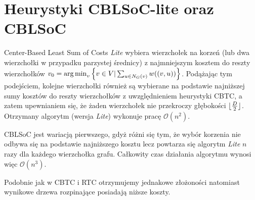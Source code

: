 \section{Heurystyki CBLSoC-lite oraz CBLSoC}

Center-Based Least Sum of Costs \textit{Lite} wybiera wierzchołek na korzeń (lub dwa wierzchołki w przypadku parzystej średnicy) z najmniejszym kosztem do reszty wierzchołków $v_0 = \operatorname*{arg\,min}_v\left\{v\in V | \sum_{u \in N_G(v)} w((v, u))\right\}$. Podążając tym podejściem, kolejne wierzchołki również są wybierane na podstawie najniższej sumy kosztów do reszty wierzchołków z uwzględnieniem heurystyki CBTC, a zatem upewnianiem się, że żaden wierzchołek nie przekroczy głębokości $\lfloor\frac{D}{2}\rfloor$. Otrzymany algorytm (wersja \textit{Lite}) wykonuje pracę $\mathcal{O}(n^2)$. 

CBLSoC jest wariacją pierwszego, gdyż różni się tym, że wybór korzenia nie odbywa się na podstawie najniższego kosztu lecz powtarza się algorytm \textit{Lite} $n$ razy dla każdego wierzchołka grafu. Całkowity czas działania algorytmu wynosi więc $\mathcal{O}(n^3)$. 

Podobnie jak w CBTC i RTC otrzymujemy jednakowe złożoności natomiast wynikowe drzewa rozpinające posiadają niższe koszty.
